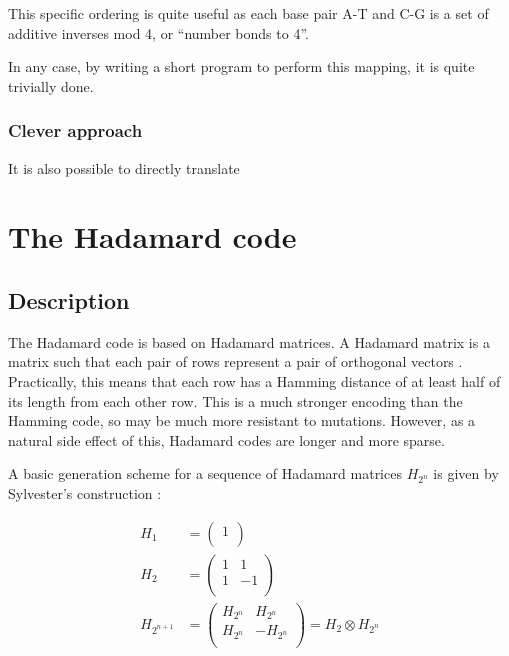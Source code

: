 \documentclass[a4paper,11pt]{article}
\begin{document}
    This specific ordering is quite useful as each base pair A-T and C-G is a
    set of additive inverses mod 4, or ``number bonds to 4''.

    In any case, by writing a short program to perform this mapping, it is quite
    trivially done.

    \subsubsection{Clever approach}

    It is also possible to directly translate

    \section{The Hadamard code}

    \subsection{Description}

    The Hadamard code is based on Hadamard matrices. A Hadamard matrix is a
    matrix such that each pair of rows represent a pair of orthogonal vectors
    \cite{HadamardMatrices1978HedayatWallis}.
    Practically, this means that each row has a Hamming distance of at least
    half of its length from each other row. This is a much stronger encoding
    than the Hamming code, so may be much more resistant to mutations. However,
    as a natural side effect of this, Hadamard codes are longer and more sparse.

    A basic generation scheme for a sequence of Hadamard matrices $H_{2^n}$ is given
    by Sylvester's construction \cite{OrthogonalMatrix1867Sylvester}:

    \begin{align*}
    H_1 &=
    \begin{pmatrix}
    1\\
    \end{pmatrix} \\
    H_2 &=
    \begin{pmatrix}
    1 &  1 \\
    1 & -1 \\
    \end{pmatrix} \\
    H_{2^{n + 1}} &=
    \begin{pmatrix}
    H_{2^n} &  H_{2^n} \\
    H_{2^n} & -H_{2^n} \\
    \end{pmatrix} =
    H_2 \otimes H_{2^n}
    \end{align*}
\end{document}
